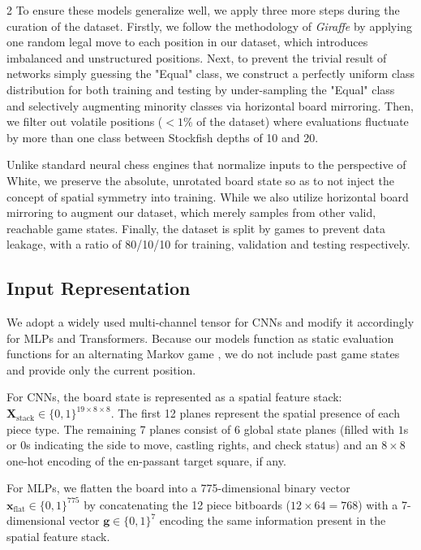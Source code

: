 \documentclass[a4paper,10pt]{article}
\begin{document}
\begin{multicols*}{2}
To ensure these models generalize well, we apply three more steps during the curation of the dataset. Firstly, we follow the methodology of \textit{Giraffe} \cite{lai2015giraffe} by applying one random legal move to each position in our dataset, which introduces imbalanced and unstructured positions. Next, to prevent the trivial result of networks simply guessing the "Equal" class, we construct a perfectly uniform class distribution for both training and testing by under-sampling the "Equal" class and selectively augmenting minority classes via horizontal board mirroring. Then, we filter out volatile positions ($<1\%$ of the dataset) where evaluations fluctuate by more than one class between Stockfish depths of 10 and 20.

Unlike standard neural chess engines that normalize inputs to the perspective of White, we preserve the absolute, unrotated board state so as to not inject the concept of spatial symmetry into training. While we also utilize horizontal board mirroring to augment our dataset, which merely samples from other valid, reachable game states. Finally, the dataset is split by games to prevent data leakage, with a ratio of 80/10/10 for training, validation and testing respectively. 

\subsection{Input Representation} 
We adopt a widely used multi-channel tensor for CNNs \cite{silver2017alphazero} and modify it accordingly for MLPs and Transformers. Because our models function as static evaluation functions for an alternating Markov game \cite{tang2024maia}, we do not include past game states and provide only the current position.

For CNNs, the board state is represented as a spatial feature stack: $\mathbf{X}_{\text{stack}} \in \{0, 1\}^{19 \times 8 \times 8}$. The first 12 planes represent the spatial presence of each piece type. The remaining 7 planes consist of 6 global state planes (filled with $1$s or $0$s indicating the side to move, castling rights, and check status) and an $8 \times 8$ one-hot encoding of the en-passant target square, if any.

For MLPs, we flatten the board into a 775-dimensional binary vector $\mathbf{x}_{\text{flat}} \in \{0,1\}^{775}$ by concatenating the 12 piece bitboards ($12 \times 64 = 768$) with a 7-dimensional vector $\mathbf{g} \in \{0, 1\}^{7}$ encoding the same information present in the spatial feature stack.


\end{multicols*}
\end{document}
